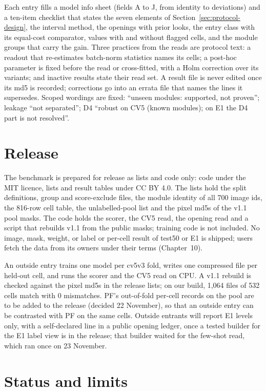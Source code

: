 Each entry fills a model info sheet (fields A to J, from identity to deviations) and a ten-item checklist that states the seven
elements of Section~\ref{sec:protocol-design}, the interval method, the openings with prior looks, the entry class with its equal-cost
comparator, values with and without flagged cells, and the module groups that carry the gain.
Three practices from the reads are protocol text: a readout that re-estimates batch-norm statistics names its cells;
a post-hoc parameter is fixed before the read or cross-fitted, with a Holm correction over its variants; and inactive results state
their read set. A result file is never edited once its md5 is recorded; corrections go into an errata file that names the lines it
supersedes. Scoped wordings are fixed: ``unseen modules: supported, not proven''; leakage ``not separated''; D4 ``robust on CV5 (known
modules); on E1 the D4 part is not resolved''.

\section{Release}
\label{sec:protocol-release}

The benchmark is prepared for release as lists and code only: code under the MIT licence, lists and result tables under
CC BY 4.0. The lists hold the split definitions, group and score-exclude files, the module identity of all 700 image ids, the 816-row
cell table, the unlabelled-pool list and the pixel md5s of the v1.1 pool masks. The code holds the scorer, the CV5 read, the opening
read and a script that rebuilds v1.1 from the public masks; training code is not included. No image, mask, weight, or label or
per-cell result of test50 or E1 is shipped; users fetch the data from its owners under their terms (Chapter~10).

An outside entry trains one model per cv5v3 fold, writes one compressed file per held-out cell, and runs the scorer and the CV5 read on
CPU. A v1.1 rebuild is checked against the pixel md5s in the release lists; on our build, 1,064 files of 532 cells match with 0 mismatches. PF's
out-of-fold per-cell records on the pool are to be added to the release (decided 22 November), so that an outside entry can be contrasted
with PF on the same cells. Outside entrants will report E1 levels only, with a self-declared line in a public opening ledger, once a
tested builder for the E1 label view is in the release; that builder waited for the few-shot read, which ran once on 23 November.

\section{Status and limits}
\label{sec:protocol-status}

